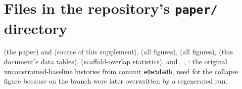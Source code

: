 \documentclass[10pt,letterpaper]{article}
\begin{document}
\section{Files in the repository's \texttt{paper/} directory}
 (the paper) and  (source of this supplement),  (all figures),  (all figures),  (this document's data tables),  (scaffold-overlap statistics), and , , : the original unconstrained-baseline histories from commit \texttt{e0e5da8b}, used for the collapse figure because  on the branch were later overwritten by a regenerated run.
\end{document}
